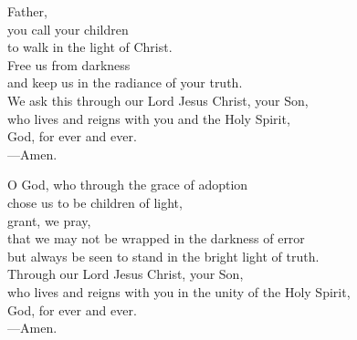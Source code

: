 \prayer


\begin{prayerverse}
Father,\\
you call your children\\
to walk in the light of Christ.\\
Free us from darkness\\
and keep us in the radiance of your truth.\\
We ask this through our Lord Jesus Christ, your Son,\\
who lives and reigns with you and the Holy Spirit,\\
God, for ever and ever.\\
{\color{red}---\thinspace}Amen.
\end{prayerverse}


\begin{prayerverse}
O God, who through the grace of adoption\\
chose us to be children of light,\\
grant, we pray,\\
that we may not be wrapped in the darkness of error\\
but always be seen to stand in the bright light of truth.\\
Through our Lord Jesus Christ, your Son,\\
who lives and reigns with you in the unity of the Holy Spirit,\\
God, for ever and ever.\\
{\color{red}---\thinspace}Amen.
\end{prayerverse}

